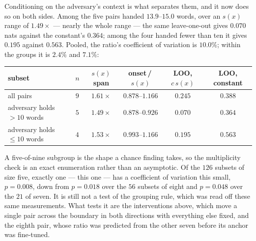 Conditioning on the adversary's context is what separates them, and it now does so on both sides.
Among the five pairs handed $13.9$--$15.0$ words, over an $s(x)$ range of $1.49\times$ --- nearly
the whole range --- the same leave-one-out gives $0.070$ nats against the constant's $0.364$; among
the four handed fewer than ten it gives $0.195$ against $0.563$. Pooled, the ratio's coefficient
of variation is $10.0\%$; within the groups it is $2.4\%$ and $7.1\%$:

\begin{center}\footnotesize
\begin{tabular}{@{}lccccc@{}}
\toprule
subset & $n$ & $s(x)$ span & onset\,/\,$s(x)$ & LOO, $c\,s(x)$ & LOO, constant \\
\midrule
all pairs                       & $9$ & $1.61\times$ & $0.878$--$1.166$ & $0.245$ & $0.388$ \\
adversary holds $>10$ words     & $5$ & $1.49\times$ & $0.878$--$0.926$ & $0.070$ & $0.364$ \\
adversary holds $\le 10$ words  & $4$ & $1.53\times$ & $0.993$--$1.166$ & $0.195$ & $0.563$ \\
\bottomrule
\end{tabular}
\end{center}

A five-of-nine subgroup is the shape a chance finding takes, so the multiplicity check is an exact
enumeration rather than an asymptotic. Of the $126$ subsets of size five, exactly one --- this one
--- has a coefficient of variation this small, $p = 0.008$, down from $p = 0.018$ over the $56$
subsets of eight and $p = 0.048$ over the $21$ of seven. It is still not a test of the grouping
rule, which was read off these same measurements. What tests it are the interventions above, which
move a single pair across the boundary in both directions with everything else fixed, and the eighth
pair, whose ratio was predicted from the other seven before its anchor was fine-tuned.
